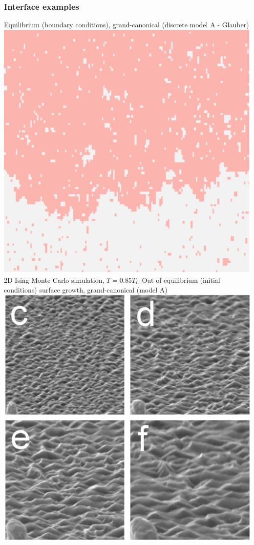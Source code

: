 \documentclass[9pt, dvipsnames]{beamer} %
\begin{document}
\begin{frame}
    \frametitle{Interface examples}
    \begin{overprint}
            Equilibrium (boundary conditions), grand-canonical (discrete model A - Glauber) \\
	        \centering       
		    \includegraphics[scale=0.7]{t-85.pdf} \\
		    2D Ising Monte Carlo simulation, $T=0.85 T_C$
            Out-of-equilibrium (initial conditions) surface growth, grand-canonical (model A) \\
	        \centering       
		    \includegraphics[scale=0.2]{crystal-growth.png} \\

\end{overprint}
\end{frame}
\end{document}
